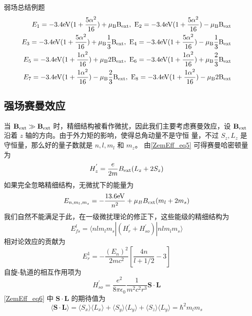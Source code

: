 \begin{example}{弱场总结例题}
\begin{align}
E_1=-3.4\rm{eV}(1+\frac{5\alpha^2}{16})+\mu_BB_{\rm{ext}},\ 
E_2=-3.4\rm{eV}(1+\frac{5\alpha^2}{16})-\mu_BB_{\rm{ext}}\\
E_3=-3.4\rm{eV}(1+\frac{5\alpha^2}{16})+\mu_B\frac{1}{3}B_{\rm{ext}},\ 
E_4=-3.4\rm{eV}(1+\frac{5\alpha^2}{16})-\mu_B\frac{1}{3}B_{\rm{ext}}\\
E_5=-3.4\rm{eV}(1+\frac{1\alpha^2}{16})+\mu_B2B_{\rm{ext}},\ 
E_6=-3.4\rm{eV}(1+\frac{1\alpha^2}{16})+\mu_B\frac{2}{3}B_{\rm{ext}}\\
E_7=-3.4\rm{eV}(1+\frac{1\alpha^2}{16})-\mu_B\frac{2}{3}B_{\rm{ext}},\ 
E_8=-3.4\rm{eV}(1+\frac{1\alpha^2}{16})-\mu_B2B_{\rm{ext}}
\end{align}

\end{example}
\subsection{强场赛曼效应}
当 $\mathbf{B}_{\rm{ext}}\gg \mathbf{B}_{\rm{ext}}$ 时，精细结构被看作微扰，因此我们主要考虑赛曼效应，设 $\mathbf{B}_{\rm{ext}}$ 沿着 $z$ 轴的方向。由于外力矩的影响，使得总角动量不是守恒
量，不过 $S_z,L_z$ 是守恒量，那么好的量子数就是 $n,l,m_l$ 和 $m_z$。 由\autoref{ZemEff_eq5} 可得赛曼哈密顿量为
\begin{equation}\label{ZemEff_eq12}
H_z^{'} = \frac{e}{2m}B_{\rm{ext}}(L_z+2S_z)
\end{equation}
如果完全忽略精细结构，无微扰下的能量为
\begin{equation}\label{ZemEff_eq7}
E_{n,m_l,m_s}=-\frac{13.6\rm{eV}}{n^2}+\mu_B B_{\rm{ext}}(m_l+2m_s)
\end{equation}
我们自然不能满足于此，在一级微扰理论的修正下，这些能级的精细结构为
\begin{equation}\label{ZemEff_eq8}
E_{fs}^l=\langle nlm_lm_s|(H^{'}_r+H^{'}_{so})|nlm_lm_s\rangle
\end{equation}
相对论效应的贡献为
\begin{equation}\label{ZemEff_eq6}
E_r^1=-\frac{(E_n)^2}{2mc^2}\left[\frac{4n}{l+1/2}-3\right]
\end{equation}
自旋-轨道的相互作用项为
\begin{equation}
H^{'}_{so}=\frac{e^2}{8\pi\epsilon_0}\frac{1}{m^2c^2r^3}\mathbf{S\cdot L}
\end{equation}
\autoref{ZemEff_eq6} 中 $\mathbf{S\cdot L}$ 的期待值为
\begin{equation}
\langle \mathbf{S\cdot L} \rangle=\langle S_x\rangle\langle L_x\rangle+\langle S_y\rangle\langle L_y\rangle+\langle S_z\rangle\langle L_y\rangle=\hbar^2
m_lm_s\end{equation}
